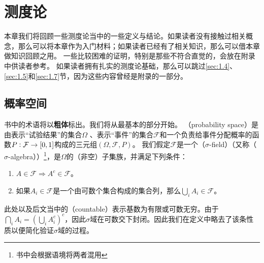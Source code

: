 \documentclass[main.tex]{subfiles}
\begin{document}
\chapter{测度论}
本章我们将回顾一些测度论当中的一些定义与结论。如果读者没有接触过相关概念，那么可以将本章作为入门材料；如果读者已经有了相关知识，那么可以借本章做知识回顾之用。
一些比较困难的证明，特别是那些不符合直觉的，会放在附录中供读者参考。
如果读者拥有扎实的测度论基础，那么可以跳过\ref{sec:1.4}、\ref{sec:1.5}和\ref{sec:1.7}节，因为这些内容曾经是附录的一部分。

\section{概率空间} \label{sec:1.1}
书中的术语将以\textbf{粗体}标出。我们将从最基本的部分开始。
（probability space）是由表示``试验结果''的集合\(\Omega\) 、表示``事件''的集合\(\mathcal{F}\)和一个负责给事件分配概率的函数\(P:\mathcal{F} \rightarrow \intcc{0, 1}\)构成的三元组\((\Omega, \mathcal{F}, P)\)。
我们假定\(\mathcal{F}\)是一个（\(\sigma\)-field）（又称（\(\sigma\)-algebra））\footnote{书中会根据语境将两者混用}，是\(\Omega\)的（非空）子集族，并满足下列条件：
\begin{enumerate}
	\item \(A \in \mathcal{F} \Rightarrow A^c \in \mathcal{F}\)。
	\item \label{def:measure:2} 如果\(A_i \in \mathcal{F}\)是一个由可数个集合构成的集合列，那么\(\bigcup_i A_i \in \mathcal{F}\)。
\end{enumerate}

此处以及后文当中的（countable）表示基数为有限或可数无穷。由于\(\bigcap_i A_i = (\bigcup_i A_i^c)^c\)，因此\(\sigma\)域在可数交下封闭。因此我们在定义中略去了该条性质以便简化验证\(\sigma\)域的过程。
\end{document}
